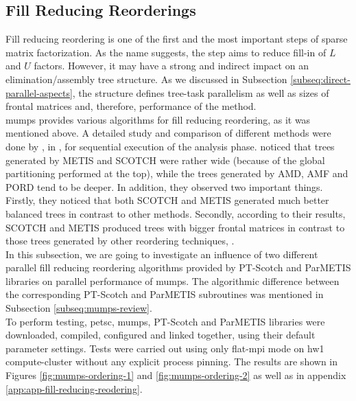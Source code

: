 \subsection{Fill Reducing Reorderings}
\label{subseq:fill-in-reordering}

Fill reducing reordering is one of the first and the most important steps of sparse matrix factorization. As the name suggests, the step aims to reduce fill-in of $L$ and $U$ factors. However, it may have a strong and indirect impact on an elimination/assembly tree structure. As we discussed in Subsection \ref{subseq:direct-parallel-aspects}, the structure defines tree-task parallelism as well as sizes of frontal matrices and, therefore, performance of the method.\\


\acrshort{mumps} provides various algorithms for fill reducing reordering, as it was mentioned above. A detailed study and comparison of different methods were done by \citeauthor{guermouche2003memory}, in  \cite{guermouche2003memory}, for sequential execution of the analysis phase. \citeauthor{guermouche2003memory} noticed that  trees generated by METIS and SCOTCH were rather wide (because of the global partitioning performed at the top), while the trees generated by AMD, AMF and PORD tend to be deeper. In addition, they observed two important things. Firstly, they noticed that both SCOTCH and METIS generated much better balanced trees in contrast to other methods. Secondly, according to their results, SCOTCH and METIS produced trees with bigger frontal matrices in contrast to those trees generated by other reordering techniques, \cite{guermouche2003memory}.\\


In this subsection, we are going to investigate an influence of two different parallel fill reducing reordering algorithms provided by PT-Scotch and ParMETIS libraries on parallel performance of \acrshort{mumps}. The algorithmic difference between the corresponding PT-Scotch and ParMETIS subroutines was mentioned in Subsection \ref{subseq:mumps-review}.\\


To perform testing, \acrshort{petsc}, \acrshort{mumps}, PT-Scotch and ParMETIS libraries were downloaded, compiled, configured and linked together, using their default parameter settings. Tests were carried out using only flat-\acrshort{mpi} mode on \gls{hw1} compute-cluster without any explicit process pinning. The results are shown in Figures \ref{fig:mumps-ordering-1} and \ref{fig:mumps-ordering-2} as well as in appendix \ref{app:app-fill-reducing-reodering}.\\



